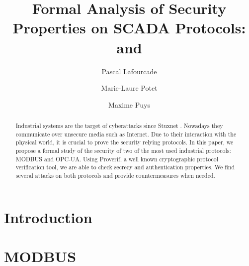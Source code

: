 \documentclass[a4paper]{article}
\title{Formal Analysis of Security Properties on SCADA Protocols: \opcua and \modbus}
\author{Pascal Lafourcade \and Marie-Laure Potet \and Maxime Puys}
\date{}
\newcommand{\opcua}{OPC-UA\xspace}
\newcommand{\modbus}{MODBUS\xspace}
\begin{document}
\maketitle

\begin{abstract}
    Industrial systems are the target of cyberattacks since Stuxnet
    \cite{Lan11}.  Nowadays they communicate over unsecure media such
    as Internet.  Due to their interaction with the physical world, it
    is crucial to prove the security relying protocols.  In this
    paper, we propose a formal study of the security of two of the
    most used industrial protocols: \modbus and \opcua.  Using
    Proverif, a well known cryptographic protocol verification tool,
    we are able to check secrecy and authentication properties.  We
    find several attacks on both protocols and provide countermeasures
    when needed.
\end{abstract}

\section{Introduction}


%
%
%

\section{\modbus}

\end{document}
